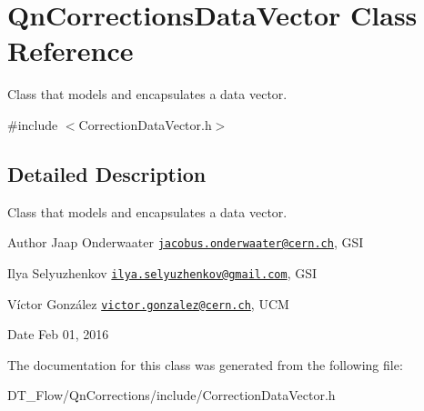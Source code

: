 \hypertarget{classQnCorrectionsDataVector}{}\section{Qn\+Corrections\+Data\+Vector Class Reference}
\label{classQnCorrectionsDataVector}


Class that models and encapsulates a data vector.  




{\ttfamily \#include $<$Correction\+Data\+Vector.\+h$>$}



\subsection{Detailed Description}
Class that models and encapsulates a data vector. 

\begin{DoxyAuthor}{Author}
Jaap Onderwaater \href{mailto:jacobus.onderwaater@cern.ch}{\tt jacobus.\+onderwaater@cern.\+ch}, G\+SI 

Ilya Selyuzhenkov \href{mailto:ilya.selyuzhenkov@gmail.com}{\tt ilya.\+selyuzhenkov@gmail.\+com}, G\+SI 

Víctor González \href{mailto:victor.gonzalez@cern.ch}{\tt victor.\+gonzalez@cern.\+ch}, U\+CM 
\end{DoxyAuthor}
\begin{DoxyDate}{Date}
Feb 01, 2016 
\end{DoxyDate}


The documentation for this class was generated from the following file\+:\begin{DoxyCompactItemize}
\item 
D\+T\+\_\+\+Flow/\+Qn\+Corrections/include/Correction\+Data\+Vector.\+h\end{DoxyCompactItemize}
